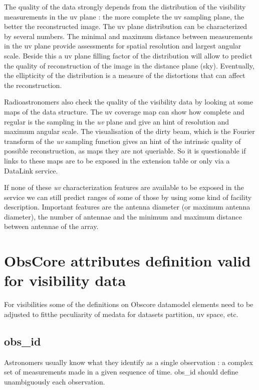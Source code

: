 \documentclass[11pt,a4paper]{ivoa}
\begin{document}
The quality of the data strongly depends from the distribution of the visibility measurements 
in the uv plane : the more complete the uv sampling plane, the better the reconstructed image. 
The uv plane distribution can be characterized by several numbers. 
The minimal and maximum distance between measurements in the uv plane provide assessments for 
spatial resolution and largest angular scale. 
Beside this a uv plane filling factor of the distribution will allow to predict the quality 
of reconstruction of the image in the distance plane (sky).
Eventually, the ellipticity of the distribution is a measure of the distortions that can 
affect the reconstruction.

Radioastronomers also check the quality of the visibility data by looking at some maps of 
the data structure. The uv coverage map can show how complete and regular is the sampling in 
the \emph{uv} plane and give an hint of resolution and maximum angular scale. 
The visualisation of the dirty beam, which is the Fourier transform of the \emph{uv} sampling 
function gives an hint of the intrinsic quality of possible reconstruction, as maps they are 
not queriable. So it is questionable if links to these maps are to be exposed in the extension 
table or only via a DataLink service. 

If none of these \emph{uv} characterization features are available to be exposed in the service 
we can still predict ranges of some of those by using some kind of facility description.  
Important features are the antenna diameter (or maximum antenna diameter), the number of 
antennae and the minimum and maximum distance between antennae of the array.

\section{ObsCore attributes definition valid for visibility data}
\label{sec:ObsCoreVisDef}

For visibilities some of the definitions on Obscore datamodel elements need to be adjusted 
to fitthe peculiarity of medata for datasets partition, uv space, etc.

\subsection{obs\_id}

Astronomers usually know what they identify as a single observation : a complex set of 
measurements made in a given sequence of time. obs\_id should define unambiguously each 
observation.
\end{document}
